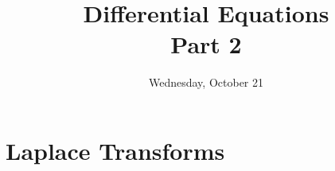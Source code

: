 \documentclass[10pt,a4paper]{article}
\begin{document}
\title{Differential Equations\\Part 2}
\date{}
\maketitle
\pagebreak
\date{Wednesday, October 21}
\section{Laplace Transforms}
\end{document}
